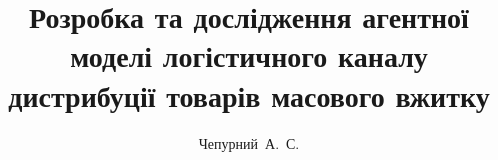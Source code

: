 \title{Розробка та дослідження агентної моделі логістичного каналу дистрибуції товарів масового вжитку}
\author{Чепурний~А.~С.}